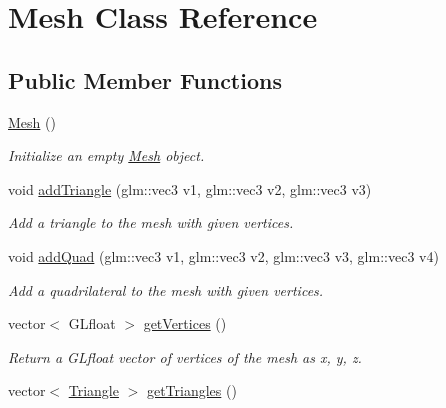 \hypertarget{classMesh}{}\section{Mesh Class Reference}
\label{classMesh}
\subsection*{Public Member Functions}
\begin{DoxyCompactItemize}
\item 
\hyperlink{classMesh_a2af137f1571af89172b9c102302c416b}{Mesh} ()\hypertarget{classMesh_a2af137f1571af89172b9c102302c416b}{}\label{classMesh_a2af137f1571af89172b9c102302c416b}

\begin{DoxyCompactList}\small\item\em Initialize an empty \hyperlink{classMesh}{Mesh} object. \end{DoxyCompactList}\item 
void \hyperlink{classMesh_a19d1ba64a723a63f89c9abba02ea2a4c}{add\+Triangle} (glm\+::vec3 v1, glm\+::vec3 v2, glm\+::vec3 v3)\hypertarget{classMesh_a19d1ba64a723a63f89c9abba02ea2a4c}{}\label{classMesh_a19d1ba64a723a63f89c9abba02ea2a4c}

\begin{DoxyCompactList}\small\item\em Add a triangle to the mesh with given vertices. \end{DoxyCompactList}\item 
void \hyperlink{classMesh_afc3c234a4be90064ec9bb52682a5de85}{add\+Quad} (glm\+::vec3 v1, glm\+::vec3 v2, glm\+::vec3 v3, glm\+::vec3 v4)\hypertarget{classMesh_afc3c234a4be90064ec9bb52682a5de85}{}\label{classMesh_afc3c234a4be90064ec9bb52682a5de85}

\begin{DoxyCompactList}\small\item\em Add a quadrilateral to the mesh with given vertices. \end{DoxyCompactList}\item 
vector$<$ G\+Lfloat $>$ \hyperlink{classMesh_a1f6642b125a065535a5d39d26aece8c1}{get\+Vertices} ()\hypertarget{classMesh_a1f6642b125a065535a5d39d26aece8c1}{}\label{classMesh_a1f6642b125a065535a5d39d26aece8c1}

\begin{DoxyCompactList}\small\item\em Return a G\+Lfloat vector of vertices of the mesh as x, y, z. \end{DoxyCompactList}\item 
vector$<$ \hyperlink{classTriangle}{Triangle} $>$ \hyperlink{classMesh_ad3661c1cb45005759607475ef5f1273c}{get\+Triangles} ()\hypertarget{classMesh_ad3661c1cb45005759607475ef5f1273c}{}\label{classMesh_ad3661c1cb45005759607475ef5f1273c}


\end{DoxyCompactItemize}
